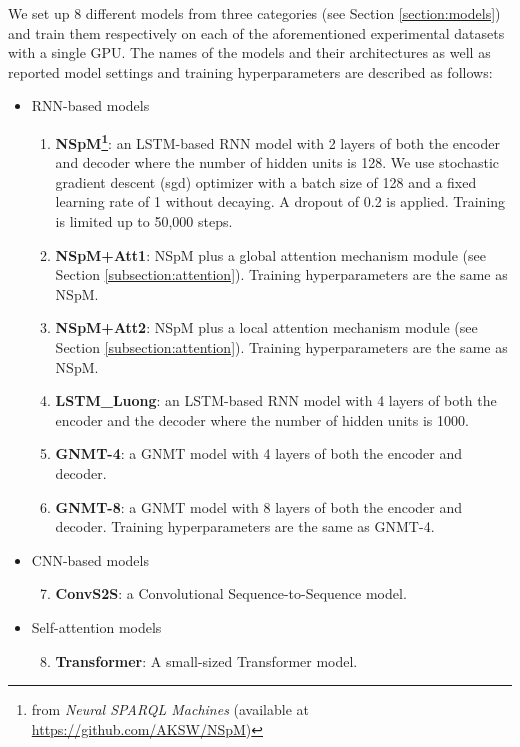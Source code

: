 We set up 8 different models from three categories (see Section \ref{section:models}) and train them respectively on each of the aforementioned experimental datasets with a single GPU. The names of the models and their architectures as well as reported model settings and training hyperparameters are described as follows:
\begin{itemize}
\item RNN-based models
\begin{enumerate}
\item \textbf{NSpM\footnote{from \textit{Neural SPARQL Machines} (available at \url{https://github.com/AKSW/NSpM})}}: an LSTM-based RNN model with 2 layers of both the encoder and decoder where the number of hidden units is 128. We use stochastic gradient descent (sgd) optimizer with a batch size of 128 and a fixed learning rate of 1 without decaying. A dropout of 0.2 is applied. Training is limited up to 50,000 steps.
\item \textbf{NSpM+Att1}: NSpM plus a global attention mechanism module (see Section \ref{subsection:attention}). Training hyperparameters are the same as NSpM.
\item \textbf{NSpM+Att2}: NSpM plus a local attention mechanism module (see Section \ref{subsection:attention}). Training hyperparameters are the same as NSpM.
\item \textbf{LSTM\_Luong}: an LSTM-based RNN model with 4 layers of both the encoder and the decoder where the number of hidden units is 1000. 
\item \textbf{GNMT-4}: a GNMT model with 4 layers of both the encoder and decoder. 
\item \textbf{GNMT-8}: a GNMT model with 8 layers of both the encoder and decoder. Training hyperparameters are the same as GNMT-4.
\end{enumerate}
\item CNN-based models
\begin{enumerate}
\setcounter{enumi}{6}
\item \textbf{ConvS2S}: a Convolutional Sequence-to-Sequence model.
\end{enumerate}
\item Self-attention models
\begin{enumerate}
\setcounter{enumi}{7}
\item \textbf{Transformer}: A small-sized Transformer model.
\end{enumerate}
\end{itemize}

